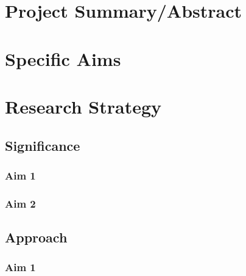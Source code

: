



\section{Project Summary/Abstract} %



\clearpage

\section{Specific Aims} %



\section{Research Strategy} %
\subsection{Significance}
\subsubsection{Aim 1}
\subsubsection{Aim 2}

\subsection{Approach}
\subsubsection{Aim 1}
